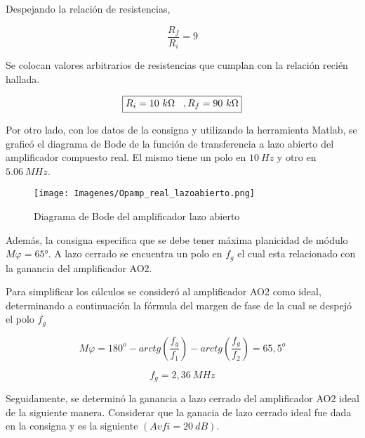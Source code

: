 \documentclass[12pt,A4paper,titlepage]{article}
\begin{document}
\bigskip
\hspace{1mm} Despejando la relación de resistencias,

\bigskip
\begin{equation}
    \frac{R_f}{R_i} = 9
\end{equation}

\bigskip
\hspace{1mm} Se colocan valores arbitrarios de resistencias que cumplan con la relación recién hallada.

\begin{equation}
    \boxed{
        R_i=10~k\Omega \hspace{3mm} , R_f=90~k\Omega
    }
\end{equation}

\bigskip
\hspace{1mm} Por otro lado, con los datos de la consigna y utilizando la herramienta Matlab, se graficó el diagrama de Bode de la función de transferencia a lazo abierto del amplificador compuesto real. El mismo tiene un polo en \(10~Hz\) y otro en \(5.06~MHz\).

\begin{figure}[!h]
    \centering
    \texttt{[image: Imagenes/Opamp\_real\_lazoabierto.png]}
    \caption{Diagrama de Bode del amplificador lazo abierto}
\end{figure}

\bigskip
\hspace{1mm} Además, la consigna especifica que se debe tener máxima planicidad de módulo \(M\varphi =65°\).  A lazo cerrado se encuentra un polo en \(f_g\) el cual esta relacionado con la ganancia del amplificador AO2.


\bigskip
\hspace{1mm} Para simplificar los cálculos se consideró al amplificador AO2 como ideal, determinando a continuación la fórmula del margen de fase de la cual se despejó el polo \( 
f_g \)

\begin{equation}
    M \varphi = 180^o - arctg \left( \frac{f_g}{f_1} \right) - arctg \left( \frac{f_g}{f_2} \right) = 65,5^o
\end{equation}

\begin{equation}
    \boxed{
    f_g = 2,36~MHz
    }
\end{equation}

\bigskip
\hspace{1mm} Seguidamente, se determinó la ganancia a lazo cerrado del amplificador AO2 ideal de la siguiente manera. Considerar que la ganacia de lazo cerrado ideal fue dada en la consigna y es la siguiente \((Avfi=20~dB)\).
\end{document}
